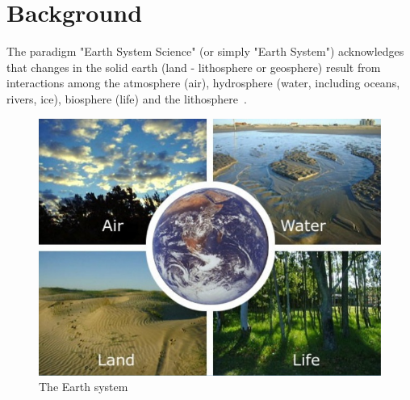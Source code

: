 
\chapter{Background}

The paradigm "Earth System Science" (or simply "Earth System") acknowledges that changes in the solid earth 
(land - lithosphere or geosphere) result from interactions among the atmosphere (air), hydrosphere (water, including oceans, rivers, ice), 
biosphere (life) and the lithosphere~\cite{introgeo}.


\begin{figure}[h!]
    \centering
    \includegraphics[scale=0.35]{pic/intro}
    \caption{The Earth system}
    \label{fig:ecearth}
\end{figure}



